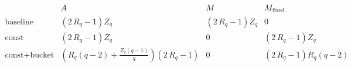 \[
\begin{array}{l|cccc}
 & A & M & M_{\mathrm{fixed}} \\
\hline
\text{baseline} & {\left(2 \, R_{q} - 1\right)} Z_{q} & {\left(2 \, R_{q} - 1\right)} Z_{q} & 0 \\
\text{const} & {\left(2 \, R_{q} - 1\right)} Z_{q} & 0 & {\left(2 \, R_{q} - 1\right)} Z_{q} \\
\text{const+bucket} & {\left(R_{q} {\left(q - 2\right)} + \frac{Z_{q} {\left(q - 1\right)}}{q}\right)} {\left(2 \, R_{q} - 1\right)} & 0 & {\left(2 \, R_{q} - 1\right)} R_{q} {\left(q - 2\right)} \\
\end{array}
\]
